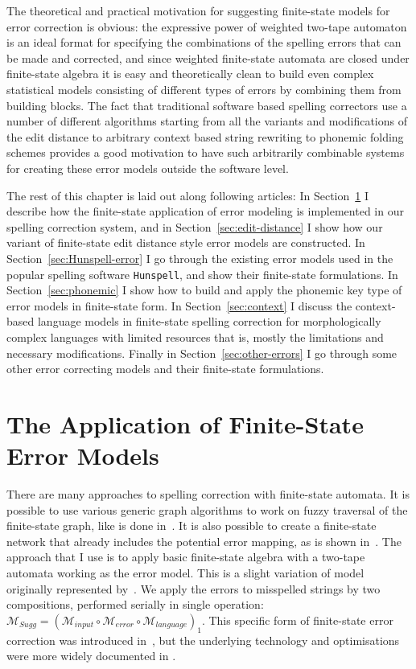 \documentclass[officiallayout]{unihelcompling}
\begin{document}
The theoretical and practical motivation for suggesting finite-state models for
error correction is obvious: the expressive power of weighted two-tape
automaton is an ideal format for specifying the combinations of the spelling
errors that can be made and corrected, and since weighted finite-state automata
are closed under finite-state algebra it is easy and theoretically clean to
build even complex statistical models consisting of different types of errors
by combining them from building blocks. The fact that traditional software
based spelling correctors use a number of different algorithms starting from
all the variants and modifications of the edit distance to arbitrary context
based string rewriting to phonemic folding schemes provides a good motivation
to have such arbitrarily combinable systems for creating these error models
outside the software level.

The rest of this chapter is laid out along following articles: In
Section~\ref{sec:error-application} I describe how the finite-state application
of error modeling is implemented in our spelling correction system, and in
Section~\ref{sec:edit-distance} I show how our variant of finite-state edit
distance style error models are constructed.  In
Section~\ref{sec:Hunspell-error} I go through the existing error models used in
the popular spelling software \texttt{Hunspell}, and show their finite-state
formulations. In Section~\ref{sec:phonemic} I show how to build and apply
the phonemic key type of error models in finite-state form. 
In Section~\ref{sec:context} I discuss the context-based language models in
finite-state spelling correction for morphologically complex languages with
limited resources that is, mostly the limitations and necessary modifications.
Finally in Section~\ref{sec:other-errors} I go through some other error
correcting models and their finite-state formulations.

\section{The Application of Finite-State Error Models}
\label{sec:error-application}

There are many approaches to spelling correction with finite-state automata.
It is possible to use various generic graph algorithms to work on fuzzy
traversal of the finite-state graph, like is done in~\citet{hulden2009fast}.
It is also possible to create a finite-state network that already includes the
potential error mapping, as is shown in~\citet{schulz2002fast}. The approach
that I use is to apply basic finite-state algebra with a two-tape automata
working as the error model. This is a slight variation of model originally
represented by~\citet{mohri2003edit}. We apply the errors to
misspelled strings by two compositions, performed serially in single operation:
$\mathcal{M}_{Sugg} = (\mathcal{M}_{input} \circ \mathcal{M}_{error} \circ
\mathcal{M}_{language})_1$.  This specific form of finite-state error
correction was introduced in~, but the
underlying technology and optimisations were more widely documented in
\citet{linden2011hfst}.
\end{document}
